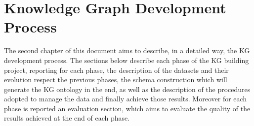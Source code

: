 \section{Knowledge Graph Development Process}

The second chapter of this document aims to describe, in a detailed way, the KG development process. The sections below describe each phase of the KG building project, reporting for each phase, the description of the datasets and their evolution respect the previous phases, the schema construction which will generate the KG ontology in the end, as well as the description of the procedures adopted to manage the data and finally achieve those results. Moreover for each phase is reported an evaluation section, which aims to evaluate the quality of the results achieved at the end of each phase. 





